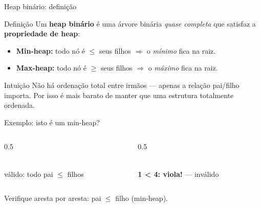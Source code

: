 \documentclass[aspectratio=169]{beamer}
\begin{document}
\begin{frame}{Heap binário: definição}
  \begin{block}{Definição}
    Um \textbf{heap binário} é uma árvore binária \emph{quase completa} que
    satisfaz a \textbf{propriedade de heap}:
    \begin{itemize}
      \item \textbf{Min-heap:} todo nó é $\le$ seus filhos $\Rightarrow$ o
        \emph{mínimo} fica na raiz.
      \item \textbf{Max-heap:} todo nó é $\ge$ seus filhos $\Rightarrow$ o
        \emph{máximo} fica na raiz.
    \end{itemize}
  \end{block}
  \begin{exampleblock}{Intuição}
    Não há ordenação total entre irmãos — apenas a relação pai/filho importa.
    Por isso é mais barato de manter que uma estrutura totalmente ordenada.
  \end{exampleblock}
\end{frame}

\begin{frame}{Exemplo: isto é um min-heap?}
  \begin{columns}[T]
    \begin{column}{0.5\textwidth}
    \centering
    \\[0.5em]
    {\color{UFSBlue}\footnotesize válido: todo pai $\le$ filhos \checkmark}
    \end{column}
    \begin{column}{0.5\textwidth}
    \centering
    \\[0.5em]
    {\color{UFSRed}\footnotesize \textbf{1 < 4: viola!} — inválido}
    \end{column}
  \end{columns}
  \begin{center}
    \footnotesize Verifique aresta por aresta: pai $\le$ filho (min-heap).
  \end{center}
\end{frame}
\end{document}
